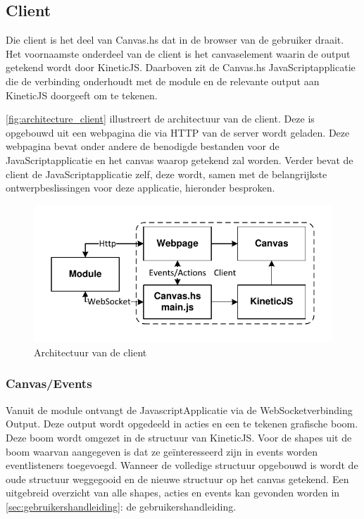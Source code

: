 
\subsection{Client}
Die client is het deel van Canvas.hs dat in de browser van de gebruiker draait. Het voornaamste onderdeel van de client is het canvaselement waarin de output getekend wordt door KineticJS. Daarboven zit de Canvas.hs JavaScriptapplicatie die de verbinding onderhoudt met de module en de relevante output aan KineticJS doorgeeft om te tekenen.

\autoref{fig:architecture_client} illustreert de architectuur van de client. Deze is opgebouwd uit een webpagina die via HTTP van de server wordt geladen. Deze webpagina bevat onder andere de benodigde bestanden voor de JavaScriptapplicatie en het canvas waarop getekend zal worden. Verder bevat de client de JavaScriptapplicatie zelf, deze wordt, samen met de belangrijkste ontwerpbeslissingen voor deze applicatie, hieronder besproken.

\begin{figure}
\begin{center}
\includegraphics[keepaspectratio,width=\textwidth]{./images/client_architecture.pdf}
\caption{Architectuur van de client}
\label{fig:architecture_client}
\end{center}
\end{figure}

\subsubsection{Canvas/Events}
Vanuit de module ontvangt de JavascriptApplicatie via de WebSocketverbinding Output. Deze output wordt opgedeeld in acties en een te tekenen grafische boom. Deze boom wordt omgezet in de structuur van KineticJS. Voor de shapes uit de boom waarvan aangegeven is dat ze ge\"interesseerd zijn in events worden eventlisteners toegevoegd. Wanneer de volledige structuur opgebouwd is wordt de oude structuur weggegooid en de nieuwe structuur op het canvas getekend. Een uitgebreid overzicht van alle shapes, acties en events kan gevonden worden in \autoref{sec:gebruikershandleiding}: de gebruikershandleiding.

